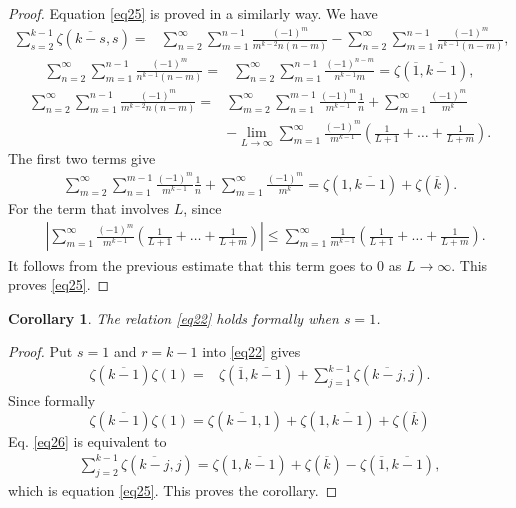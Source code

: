 \documentclass[reqno]{amsart}
\newtheorem{corollary}[theorem]{Corollary}
\theoremstyle{definition}
\theoremstyle{remark}
\numberwithin{equation}{section}
\begin{document}
\begin{proof}
Equation \eqref{eq25} is proved in a similarly way. We have
\begin{align*}
\sum_{s=2}^{k-1}\zeta(\overline{k-s}, s)
=&\sum_{n=2}^{\infty}\sum_{m=1}^{n-1} \frac{(-1)^m}{m^{k-2}n(n-m)}-\sum_{n=2}^{\infty}\sum_{m=1}^{n-1}  \frac{(-1)^m}{n^{k-1}(n-m)},
\end{align*}
\begin{align*}
\sum_{n=2}^{\infty}\sum_{m=1}^{n-1}  \frac{(-1)^m}{n^{k-1}(n-m)}=&\sum_{n=2}^{\infty}\sum_{m=1}^{n-1}  \frac{(-1)^{n-m}}{n^{k-1}m}=\zeta(\overline{1}, \overline{k-1}),
\end{align*}
\begin{align*}
\sum_{n=2}^{\infty}\sum_{m=1}^{n-1}  \frac{(-1)^m}{m^{k-2}n(n-m)}
=&\sum_{m=2}^{\infty} \sum_{n=1}^{m-1}\frac{(-1)^m}{m^{k-1}}\frac{1}{n}+\sum_{m=1}^{\infty} \frac{(-1)^m}{m^{k}}\\&-\lim_{L\rightarrow\infty}\sum_{m=1}^{\infty} \frac{(-1)^m}{m^{k-1}}\left( \frac{1}{L+1}+\ldots+\frac{1}{L+m}\right).
\end{align*}The first two terms give
\begin{align*}
\sum_{m=2}^{\infty} \sum_{n=1}^{m-1}\frac{(-1)^m}{m^{k-1}}\frac{1}{n}+\sum_{m=1}^{\infty} \frac{(-1)^m}{m^{k}}=\zeta(1,\overline{k-1})+\zeta(\overline{k}).
\end{align*}
For the term that involves $L$, since
\begin{align*}
&\left| \sum_{m=1}^{\infty} \frac{(-1)^m}{m^{k-1}}\left( \frac{1}{L+1}+\ldots+\frac{1}{L+m}\right)\right|
\leq  \sum_{m=1}^{\infty} \frac{1}{m^{k-1}}\left( \frac{1}{L+1}+\ldots+\frac{1}{L+m}\right).
\end{align*}It follows from the previous estimate that this term goes to 0 as $L\rightarrow \infty$.
This proves \eqref{eq25}.
\end{proof}
\vfill
\pagebreak
\begin{corollary}
The relation \eqref{eq22} holds formally when $s=1$.
\end{corollary}
\begin{proof}
Put $s=1$ and $r=k-1$ into \eqref{eq22} gives
\begin{align}\label{eq26}
\zeta(\overline{k-1})\zeta(1)=& \zeta(\overline{1}, \overline{k-1})+\sum_{j=1}^{k-1}  \zeta(\overline{k-j}, j).
\end{align}
Since formally
$$\zeta(\overline{k-1})\zeta(1)=\zeta(\overline{k-1}, 1)+\zeta(1, \overline{k-1})+\zeta(\overline{k})$$
Eq. \eqref{eq26} is equivalent to
\begin{align*}
\sum_{j=2}^{k-1}  \zeta(\overline{k-j}, j)=\zeta(1, \overline{k-1})+\zeta(\overline{k})-\zeta(\overline{1}, \overline{k-1}),
\end{align*}which is equation \eqref{eq25}. This proves the corollary.
\end{proof}
\end{document}
